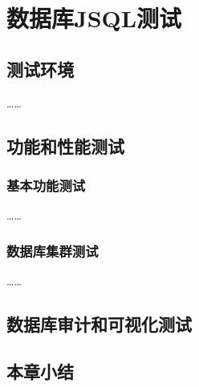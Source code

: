 
\chapter{数据库JSQL测试}
\section{测试环境}


……
\section{功能和性能测试}

\subsection{基本功能测试}
……
\subsection{数据库集群测试}
……

\section{数据库审计和可视化测试}



\section{本章小结}
